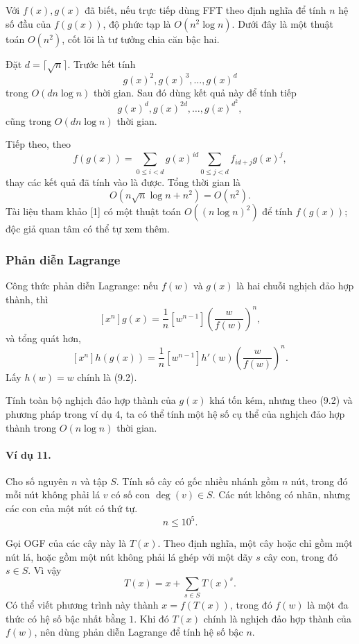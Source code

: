 \documentclass[11pt]{article}
\begin{document}
Với \(f(x),g(x)\) đã biết, nếu trực tiếp dùng FFT theo định nghĩa để tính \(n\)
hệ số đầu của \(f(g(x))\), độ phức tạp là \(O(n^2\log n)\). Dưới đây là một
thuật toán \(O(n^2)\), cốt lõi là tư tưởng chia căn bậc hai.

Đặt \(d=\lceil\sqrt n\rceil\). Trước hết tính
\[
  g(x)^2,g(x)^3,\ldots,g(x)^d
\]
trong \(O(dn\log n)\) thời gian. Sau đó dùng kết quả này để tính tiếp
\[
  g(x)^d,g(x)^{2d},\ldots,g(x)^{d^2},
\]
cũng trong \(O(dn\log n)\) thời gian.

Tiếp theo, theo
\[
  f(g(x))=\sum_{0\le i<d} g(x)^{id}
  \sum_{0\le j<d} f_{id+j}g(x)^j, \tag{9.1}
\]
thay các kết quả đã tính vào là được. Tổng thời gian là
\[
  O(n\sqrt n\log n+n^2)=O(n^2).
\]
Tài liệu tham khảo [1] có một thuật toán \(O((n\log n)^2)\) để tính
\(f(g(x))\); độc giả quan tâm có thể tự xem thêm.

\subsubsection{Phản diễn Lagrange}

Công thức phản diễn Lagrange: nếu \(f(w)\) và \(g(x)\) là hai chuỗi nghịch đảo
hợp thành, thì
\[
  [x^n]g(x)=\frac1n[w^{n-1}]\left(\frac{w}{f(w)}\right)^n, \tag{9.2}
\]
và tổng quát hơn,
\[
  [x^n]h(g(x))
  =\frac1n[w^{n-1}]h'(w)\left(\frac{w}{f(w)}\right)^n. \tag{9.3}
\]
Lấy \(h(w)=w\) chính là (9.2).

Tính toàn bộ nghịch đảo hợp thành của \(g(x)\) khá tốn kém, nhưng theo (9.2) và
phương pháp trong ví dụ 4, ta có thể tính một hệ số cụ thể của nghịch đảo hợp
thành trong \(O(n\log n)\) thời gian.

\paragraph{Ví dụ 11.}
Cho số nguyên \(n\) và tập \(S\). Tính số cây có gốc nhiều nhánh gồm \(n\) nút,
trong đó mỗi nút không phải lá \(v\) có số con \(\deg(v)\in S\). Các nút không
có nhãn, nhưng các con của một nút có thứ tự.
\[
  n\le 10^5.
\]

Gọi OGF của các cây này là \(T(x)\). Theo định nghĩa, một cây hoặc chỉ gồm một
nút lá, hoặc gồm một nút không phải lá ghép với một dãy \(s\) cây con, trong đó
\(s\in S\). Vì vậy
\[
  T(x)=x+\sum_{s\in S}T(x)^s. \tag{9.4}
\]
Có thể viết phương trình này thành \(x=f(T(x))\), trong đó \(f(w)\) là một đa
thức có hệ số bậc nhất bằng \(1\). Khi đó \(T(x)\) chính là nghịch đảo hợp thành
của \(f(w)\), nên dùng phản diễn Lagrange để tính hệ số bậc \(n\).
\end{document}
